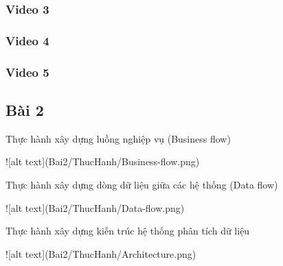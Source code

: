 \documentclass{article}
\begin{document}
\subsubsection{Video 3}

\subsubsection{Video 4}

\subsubsection{Video 5}

\subsection{Bài 2}

\caption{Thực hành xây dựng luồng nghiệp vụ (Business flow)}
![alt text](Bai2/ThucHanh/Business-flow.png)
\caption{Thực hành xây dựng dòng dữ liệu giữa các hệ thống (Data flow)}
![alt text](Bai2/ThucHanh/Data-flow.png)
\caption{Thực hành xây dựng kiến trúc hệ thống phân tích dữ liệu}
![alt text](Bai2/ThucHanh/Architecture.png)

\end{document}
